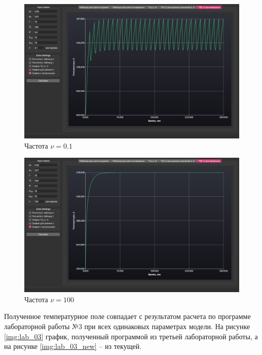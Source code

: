 \begin{enumerate}
        \begin{figure}[H]
            \centering
            \includegraphics[scale=0.35]{img/impulse3.png}
            \caption{Частота $\nu = 0.1$}
            \label{img:impulse3}
        \end{figure}

        \begin{figure}[H]
            \centering
            \includegraphics[scale=0.35]{img/impulse4.png}
            \caption{Частота $\nu = 100$}
            \label{img:impulse4}
        \end{figure}

        Полученное температурное поле совпадает с результатом расчета по программе лабораторной работы №3 при всех одинаковых параметрах модели. На рисунке \ref{img:lab_03} график, полученный программой из третьей лабораторной работы, а на рисунке \ref{img:lab_03_new} -- из текущей.


\end{enumerate}
